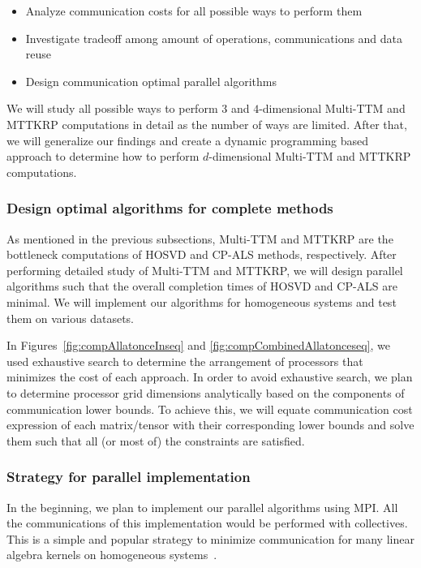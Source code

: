 \documentclass[a4paper,11pt]{article}
\begin{document}
	
	\begin{itemize}
		\item Analyze communication costs for all possible ways to perform them 
		\item Investigate tradeoff among amount of operations, communications and data reuse
		\item Design communication optimal parallel algorithms
	\end{itemize}
	
	
	We will study all possible ways to perform $3$ and $4$-dimensional Multi-TTM and MTTKRP computations in detail as the number of ways are limited. After that, we will generalize our findings and create a dynamic programming based approach to determine how to perform $d$-dimensional Multi-TTM and MTTKRP computations.
	
	\subsubsection*{Design optimal algorithms for complete methods}

	As mentioned in the previous subsections, Multi-TTM and MTTKRP are  the bottleneck computations of HOSVD and CP-ALS methods, respectively. After performing detailed study of Multi-TTM and MTTKRP, we will design parallel algorithms such that the overall completion times of HOSVD and CP-ALS are minimal. We will implement our algorithms for homogeneous systems and test them on various datasets. 
	
	In Figures~\ref{fig:compAllatonceInseq} and \ref{fig:compCombinedAllatonceseq}, we used exhaustive search to determine the arrangement of processors that minimizes the cost of each approach. In order to avoid exhaustive search, we plan to determine processor grid dimensions analytically based on the components of communication lower bounds. To achieve this, we will equate communication cost expression of each matrix/tensor with their corresponding lower bounds and solve them such that all (or most of) the constraints are satisfied.
	

	
	
	\subsubsection*{Strategy for parallel implementation}
	In the beginning, we plan to implement our parallel algorithms using MPI. All the communications of this implementation would be performed with collectives. This is a simple and popular strategy to minimize communication for many linear algebra kernels on homogeneous systems~\cite{ABK-IPDPS-2016,BKK-TOMS-2020}.
	
\end{document}
